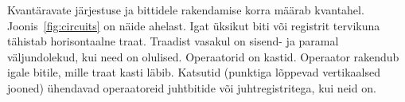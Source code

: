 \documentclass[12pt]{report}
\def\SWAP{\mathop{\mathrm{SWAP}}\nolimits}
\begin{document}
\begin{table}[]
    \caption{Töös kasutatud operaatorid, nende tähtistused, definitsioonid ja tähitused ahelas}
    \label{tab:gates}
\end{table}

Kvantäravate järjestuse ja bittidele rakendamise korra määrab kvantahel.
Joonis~\ref{fig:circuits} on näide ahelast. Igat üksikut biti või registrit
tervikuna tähistab horisontaalne traat. Traadist vasakul on sisend- ja paramal
väljundolekud, kui need on olulised. Operaatorid on kastid. Operaator rakendub
igale bitile, mille traat kasti läbib. Katsutid (punktiga lõppevad vertikaalsed
jooned) ühendavad operaatoreid juhtbitide või juhtregistritega, kui neid on.
\end{document}
